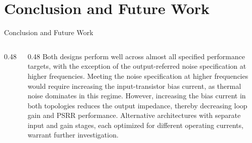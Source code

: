 \documentclass[10pt, aspectratio=169]{beamer}
\newcommand{\svg}[3]{
    \begin{figure}
        \centering
        
        \caption{#2}
    \end{figure}
}
\begin{document}
\section{Conclusion and Future Work}
\begin{frame}{Conclusion and Future Work}
    \begin{columns}[c,onlytextwidth]
        \begin{column}{0.48\textwidth}
            \svg{../images/cm_ota.svg}{Current Mirror OTA}{1}
        \end{column}
        \begin{column}{0.48\textwidth}
            Both designs perform well across almost all specified performance targets, with the exception of the output-referred noise specification at higher frequencies. Meeting the noise specification at higher frequencies would require increasing the input-transistor bias current, as thermal noise dominates in this regime. However, increasing the bias current in both topologies reduces the output impedance, thereby decreasing loop gain and PSRR performance. Alternative architectures with separate input and gain stages, each optimized for different operating currents, warrant further investigation.
        \end{column}
    \end{columns}
\end{frame}
\end{document}
